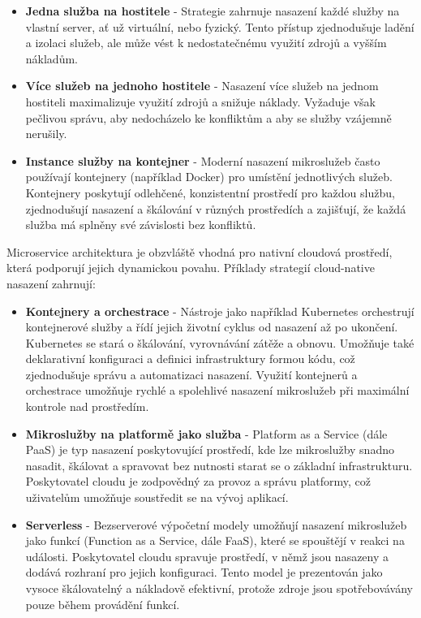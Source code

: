 \begin{itemize}
    \item \textbf{Jedna služba na hostitele} - Strategie zahrnuje nasazení každé služby na vlastní server, ať už virtuální, nebo fyzický. Tento přístup zjednodušuje ladění a izolaci služeb, ale může vést k nedostatečnému využití zdrojů a vyšším nákladům.
    \item \textbf{Více služeb na jednoho hostitele} - Nasazení více služeb na jednom hostiteli maximalizuje využití zdrojů a snižuje náklady. Vyžaduje však pečlivou správu, aby nedocházelo ke konfliktům a aby se služby vzájemně nerušily.
    \item \textbf{Instance služby na kontejner} - Moderní nasazení mikroslužeb často používají kontejnery (například Docker) pro umístění jednotlivých služeb. Kontejnery poskytují odlehčené, konzistentní prostředí pro každou službu, zjednodušují nasazení a škálování v různých prostředích a zajišťují, že každá služba má splněny své závislosti bez konfliktů.
\end{itemize}


Microservice architektura je obzvláště vhodná pro nativní cloudová prostředí, která podporují jejich dynamickou povahu. Příklady strategií cloud-native nasazení zahrnují:

\begin{itemize}
    \item \textbf{Kontejnery a orchestrace} - Nástroje jako například Kubernetes orchestrují kontejnerové služby a řídí jejich životní cyklus od nasazení až po ukončení. Kubernetes se stará o škálování, vyrovnávání zátěže a obnovu. Umožňuje také deklarativní konfiguraci a  definici infrastruktury formou kódu, což zjednodušuje správu a automatizaci nasazení. Využití kontejnerů a orchestrace umožňuje rychlé a spolehlivé nasazení mikroslužeb při maximální kontrole nad prostředím.
    \item \textbf{Mikroslužby na platformě jako služba} - Platform as a Service (dále PaaS) je typ nasazení poskytovující prostředí, kde lze mikroslužby snadno nasadit, škálovat a spravovat bez nutnosti starat se o základní infrastrukturu. Poskytovatel cloudu je zodpovědný za provoz a správu platformy, což uživatelům umožňuje soustředit se na vývoj aplikací.
    \item \textbf{Serverless} - Bezserverové výpočetní modely umožňují nasazení mikroslužeb jako funkcí (Function as a Service, dále FaaS), které se spouštějí v reakci na události. Poskytovatel cloudu spravuje prostředí, v němž jsou nasazeny a dodává rozhraní pro jejich konfiguraci. Tento model je prezentován jako vysoce škálovatelný a nákladově efektivní, protože zdroje jsou spotřebovávány pouze během provádění funkcí. \cite{Garrison2017}
\end{itemize}
